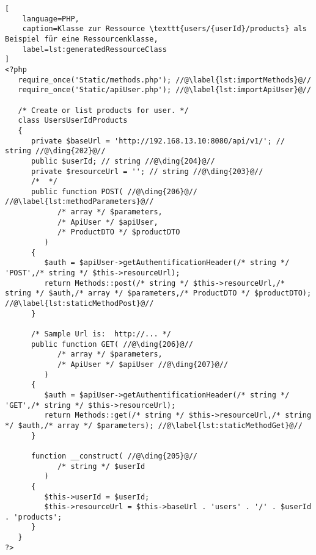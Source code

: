 \begin{minipage}{\textwidth}
\begin{lstlisting}[
    language=PHP,
    caption=Klasse zur Ressource \texttt{users/{userId}/products} als Beispiel für eine Ressourcenklasse,
    label=lst:generatedRessourceClass
]
<?php
   require_once('Static/methods.php'); //@\label{lst:importMethods}@//
   require_once('Static/apiUser.php'); //@\label{lst:importApiUser}@//

   /* Create or list products for user. */
   class UsersUserIdProducts
   {
      private $baseUrl = 'http://192.168.13.10:8080/api/v1/'; // string //@\ding{202}@//
      public $userId; // string //@\ding{204}@//
      private $resourceUrl = ''; // string //@\ding{203}@//
      /*  */
      public function POST( //@\ding{206}@// //@\label{lst:methodParameters}@//
            /* array */ $parameters, 
            /* ApiUser */ $apiUser,
            /* ProductDTO */ $productDTO
         )
      {
         $auth = $apiUser->getAuthentificationHeader(/* string */ 'POST',/* string */ $this->resourceUrl);
         return Methods::post(/* string */ $this->resourceUrl,/* string */ $auth,/* array */ $parameters,/* ProductDTO */ $productDTO); //@\label{lst:staticMethodPost}@//
      }

      /* Sample Url is:  http://... */
      public function GET( //@\ding{206}@//
            /* array */ $parameters,
            /* ApiUser */ $apiUser //@\ding{207}@//
         )
      {
         $auth = $apiUser->getAuthentificationHeader(/* string */ 'GET',/* string */ $this->resourceUrl);
         return Methods::get(/* string */ $this->resourceUrl,/* string */ $auth,/* array */ $parameters); //@\label{lst:staticMethodGet}@//
      }

      function __construct( //@\ding{205}@//
            /* string */ $userId
         )
      {
         $this->userId = $userId;
         $this->resourceUrl = $this->baseUrl . 'users' . '/' . $userId . 'products';
      }
   }
?>
\end{lstlisting}
\end{minipage}

